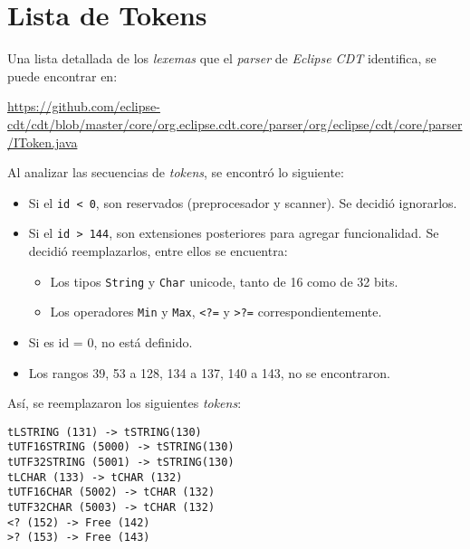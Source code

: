 \chapter{Lista de Tokens}
\label{ape:tok}

Una lista detallada de los \textit{lexemas} que el \textit{parser} de \textit{Eclipse CDT} identifica,
se puede encontrar en:

\url{https://github.com/eclipse-cdt/cdt/blob/master/core/org.eclipse.cdt.core/parser/org/eclipse/cdt/core/parser/IToken.java}

Al analizar las secuencias de \textit{tokens}, se encontró lo siguiente:

\begin{itemize}
  \item Si el \lstinline{id < 0}, son reservados (preprocesador y scanner). Se decidió ignorarlos.
  \item Si el \lstinline{id > 144}, son extensiones posteriores para agregar funcionalidad.
  Se decidió reemplazarlos, entre ellos se encuentra:
  \begin{itemize}
	\item Los tipos \lstinline{String} y \lstinline{Char} unicode, tanto de 16 como de 32 bits.
	\item Los operadores \lstinline{Min} y \lstinline{Max}, \lstinline{<?=} y \lstinline{>?=} correspondientemente.
  \end{itemize}
  \item Si es id = 0, no está definido.
  \item Los rangos 39, 53 a 128, 134 a 137, 140 a 143, no se encontraron.
\end{itemize}

Así, se reemplazaron los siguientes \textit{tokens}:
\begin{lstlisting}[caption={Preprocesamiento de Tokens.}]
tLSTRING (131) -> tSTRING(130)
tUTF16STRING (5000) -> tSTRING(130)
tUTF32STRING (5001) -> tSTRING(130)
tLCHAR (133) -> tCHAR (132)
tUTF16CHAR (5002) -> tCHAR (132)
tUTF32CHAR (5003) -> tCHAR (132)
<? (152) -> Free (142)
>? (153) -> Free (143)
\end{lstlisting}